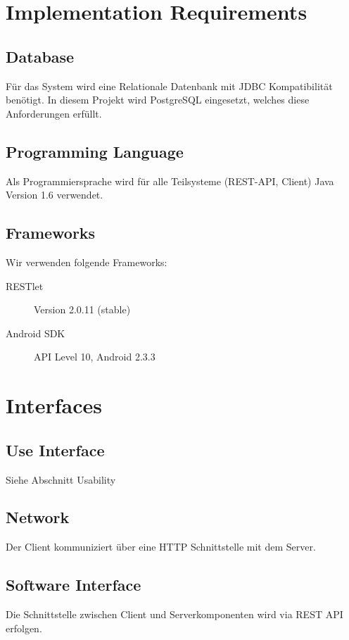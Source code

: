 \documentclass[10pt,a4paper]{scrartcl}
\begin{document}
\section{Implementation Requirements}

	\subsection{Database}

	Für das System wird eine Relationale Datenbank mit JDBC Kompatibilität benötigt.
	In diesem Projekt wird PostgreSQL eingesetzt, welches diese Anforderungen erfüllt.

	\subsection{Programming Language}

	Als Programmiersprache wird für alle Teilsysteme (REST-API, Client) Java Version 1.6 verwendet.

	\subsection{Frameworks}

	Wir verwenden folgende Frameworks:

	\begin{description}
		\item[RESTlet] Version 2.0.11 (stable)
		\item[Android SDK] API Level 10, Android 2.3.3 
	\end{description}

\section{Interfaces}
\subsection{Use Interface}
Siehe Abschnitt Usability
\subsection{Network}
Der Client kommuniziert über eine HTTP Schnittstelle mit dem Server.
\subsection{Software Interface}
Die Schnittstelle zwischen Client und Serverkomponenten wird via REST API erfolgen.


\end{document}
